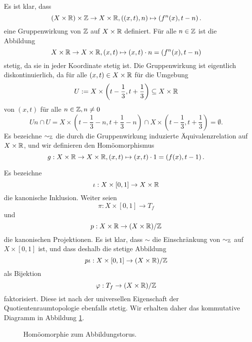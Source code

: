 \documentclass[a4paper,10pt]{article}
\begin{document}
\section{}
Es ist klar, dass
\[
 (X \times \mathbb{R}) \times \mathbb{Z} \to X \times \mathbb{R}, ((x,t),n) \mapsto \left( f^{n}(x), t-n \right).
\]
eine Gruppenwirkung von $\mathbb{Z}$ auf $X \times \mathbb{R}$ definiert. Für alle $n \in \mathbb{Z}$ ist die Abbildung
\[
 X \times \mathbb{R} \to X \times \mathbb{R}, (x,t) \mapsto (x,t) \cdot n =  \left( f^{n}(x), t-n \right)
\]
stetig, da sie in jeder Koordinate stetig ist. Die Gruppenwirkung ist eigentlich diskontinuierlich, da für alle $(x,t) \in X \times \mathbb{R}$ für die Umgebung
\[
 U := X \times \left( t-\frac{1}{3} , t + \frac{1}{3} \right) \subseteq X \times \mathbb{R}
\]
von $(x,t)$ für alle $n \in \mathbb{Z}, n \neq 0$
\[
 Un \cap U
 = X \times \left( t-\frac{1}{3}-n, t+\frac{1}{3}-n \right) \cap X \times \left( t-\frac{1}{3}, t+\frac{1}{3} \right)
 = \emptyset.
\]
Es bezeichne $\sim_{\mathbb{Z}}$ die durch die Gruppenwirkung induzierte Äquivalenzrelation auf $X \times \mathbb{R}$, und wir definieren den Homöomorphismus
\[
 g : X \times \mathbb{R} \to X \times \mathbb{R}, (x,t) \mapsto (x,t) \cdot 1 = \left( f(x), t-1 \right).
\]

Es bezeichne
\[
 \iota : X \times [0,1] \to X \times \mathbb{R}
\]
die kanonische Inklusion. Weiter seien
\[
 \pi : X \times [0,1] \to T_f
\]
und
\[
 p : X \times \mathbb{R} \to (X \times \mathbb{R})/\mathbb{Z}
\]
die kanonischen Projektionen. Es ist klar, dass $\sim$ die Einschränkung von $\sim_{\mathbb{Z}}$ auf $X \times [0,1]$ ist, und dass deshalb die stetige Abbildung
\[
 p \iota : X \times [0,1] \to (X \times \mathbb{R})/\mathbb{Z}
\]
als Bijektion
\[
 \varphi : T_f \to (X \times \mathbb{R})/\mathbb{Z}
\]
faktorisiert. Diese ist nach der universellen Eigenschaft der Quotientenraumtopologie ebenfalls stetig. Wir erhalten daher das kommutative Diagramm in Abbildung \ref{fig: Abbildungstorus}.
\begin{figure}[ht]\centering
 \caption{Homöomorphie zum Abbildungstorus.}
 \label{fig: Abbildungstorus}
\end{figure}
\end{document}
